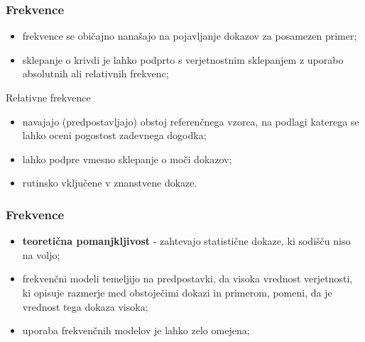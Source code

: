 \documentclass{beamer}
\begin{document}
\begin{frame}
    \frametitle{Frekvence}
    \begin{itemize}
        \item frekvence se običajno nanašajo na pojavljanje dokazov za posamezen primer;
        \item sklepanje o krivdi je lahko podprto s verjetnostnim sklepanjem z uporabo absolutnih ali relativnih frekvenc;
    \end{itemize}
    \begin{block}{Relativne frekvence}
        \begin{itemize}
            \item navajajo (predpostavljajo) obstoj referenčnega vzorca, na podlagi katerega se lahko oceni pogostost zadevnega dogodka;
            \item lahko podpre vmesno sklepanje o moči dokazov;
            \item rutinsko vključene v znanstvene dokaze.
        \end{itemize}  
    \end{block}
\end{frame}

\begin{frame}
    \frametitle{Frekvence}
    \begin{itemize}
        \item \textbf{teoretična pomanjkljivost} - zahtevajo statistične dokaze, ki sodišču niso na voljo;
        \item frekvenčni modeli temeljijo na predpostavki, da visoka vrednost verjetnosti, ki opisuje razmerje med obstoječimi dokazi in primerom, pomeni, da je vrednost tega dokaza visoka;
        \item uporaba frekvenčnih modelov je lahko zelo omejena;
    \end{itemize} \vspace{3mm}
\end{frame}
\end{document}
